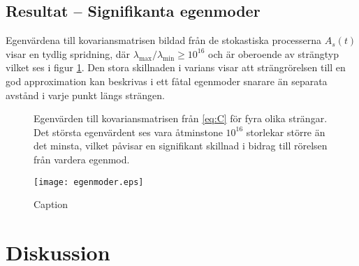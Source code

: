 \subsection{Resultat -- Signifikanta egenmoder}

Egenvärdena till kovariansmatrisen bildad från de stokastiska processerna $A_s(t)$ visar en tydlig spridning, där $\lambda_\text{max}/\lambda_\text{min}\geq 10^{16}$ och är oberoende av strängtyp vilket ses i figur \ref{fig:kovegenvarde}. Den stora skillnaden i varians visar att strängrörelsen till en god approximation kan beskrivas i ett fåtal egenmoder snarare än separata avstånd i varje punkt längs strängen. 



\begin{figure}
    \centering
    
    \caption{Egenvärden till kovariansmatrisen från \eqref{eq:C} för fyra olika strängar. Det största egenvärdent ses vara åtminstone $10^{16}$ storlekar större än det minsta, vilket påvisar en signifikant skillnad i bidrag till rörelsen från vardera egenmod.}
    \label{fig:kovegenvarde}
\end{figure}



\begin{figure}
    \centering
    \texttt{[image: egenmoder.eps]}
    \caption{Caption}
    \label{fig:egenmoder}
\end{figure}





\section{Diskussion}




